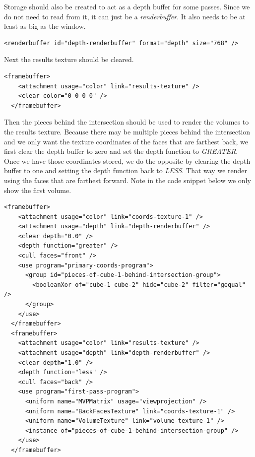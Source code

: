 \documentclass{article}
\begin{document}
Storage should also be created to act as a depth buffer for some passes.  Since
we do not need to read from it, it can just be a \emph{renderbuffer}.  It also
needs to be at least as big as the window.

\begin{Verbatim}[fontsize=\small]
  <renderbuffer id="depth-renderbuffer" format="depth" size="768" />
\end{Verbatim}

Next the results texture should be cleared.

\begin{Verbatim}[fontsize=\small]
  <framebuffer>
    <attachment usage="color" link="results-texture" />
    <clear color="0 0 0 0" />
  </framebuffer>
\end{Verbatim}

Then the pieces behind the intersection should be used to render the volumes to
the results texture.  Because there may be multiple pieces behind the
intersection and we only want the texture coordinates of the faces that are
farthest back, we first clear the depth buffer to zero and set the depth
function to \emph{GREATER}.  Once we have those coordinates stored, we do the
opposite by clearing the depth buffer to one and setting the depth function back
to \emph{LESS}.  That way we render using the faces that are farthest forward.
Note in the code snippet below we only show the first volume.

\begin{Verbatim}[fontsize=\small]
  <framebuffer>
    <attachment usage="color" link="coords-texture-1" />
    <attachment usage="depth" link="depth-renderbuffer" />
    <clear depth="0.0" />
    <depth function="greater" />
    <cull faces="front" />
    <use program="primary-coords-program">
      <group id="pieces-of-cube-1-behind-intersection-group">
        <booleanXor of="cube-1 cube-2" hide="cube-2" filter="gequal" />
      </group>
    </use>
  </framebuffer>
  <framebuffer>
    <attachment usage="color" link="results-texture" />
    <attachment usage="depth" link="depth-renderbuffer" />
    <clear depth="1.0" />
    <depth function="less" />
    <cull faces="back" />
    <use program="first-pass-program">
      <uniform name="MVPMatrix" usage="viewprojection" />
      <uniform name="BackFacesTexture" link="coords-texture-1" />
      <uniform name="VolumeTexture" link="volume-texture-1" />
      <instance of="pieces-of-cube-1-behind-intersection-group" />
    </use>
  </framebuffer>
\end{Verbatim}
\end{document}
